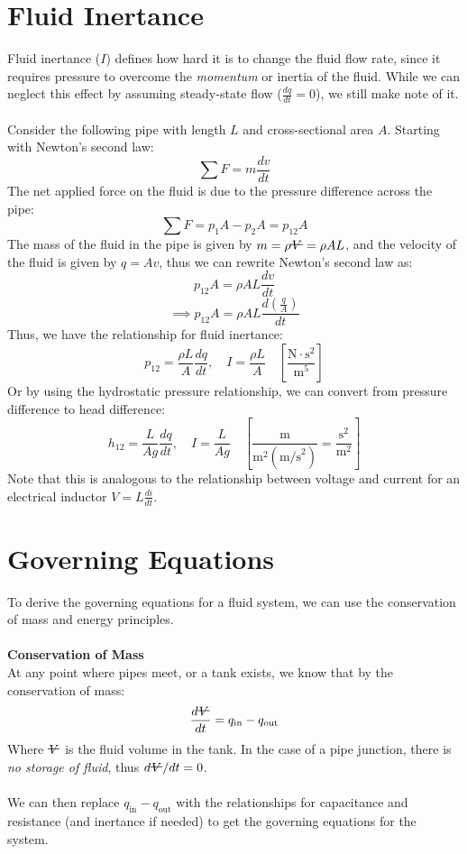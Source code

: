 \documentclass[12pt]{article}
\newcommand{\vol}{\mathord{\text{\ooalign{\hidewidth $V$\hidewidth\cr\kern-0.5pt\raisebox{0.8ex}{\rule[0pt]{1em}{0.5pt}}}}}}
\begin{document}
\section*{Fluid Inertance}
Fluid inertance ($I$) defines how hard it is to change the fluid flow rate, since it requires pressure to overcome the \textit{momentum} or inertia of the fluid. While we can neglect this effect by assuming steady-state flow ($\frac{dq}{dt}=0$), we still make note of it.\\\\
Consider the following pipe with length $L$ and cross-sectional area $A$. Starting with Newton's second law:
\[\sum F=m\frac{dv}{dt}\]
The net applied force on the fluid is due to the pressure difference across the pipe:
\[\sum F = p_1A - p_2A = p_{12}A\]
The mass of the fluid in the pipe is given by $m=\rho \vol = \rho AL$, and the velocity of the fluid is given by $q=Av$, thus we can rewrite Newton's second law as:
\[p_{12}A = \rho AL \frac{dv}{dt}\]
\[\implies p_{12}A = \rho AL \frac{d(\frac{q}{A})}{dt}\]
Thus, we have the relationship for fluid inertance:
\[\boxed{p_{12} = \frac{\rho L}{A}\frac{dq}{dt},\quad I = \frac{\rho L}{A}\quad\left[\frac{\text{N}\cdot\text{s}^2}{\text{m}^5}\right]}\]
Or by using the hydrostatic pressure relationship, we can convert from pressure difference to head difference:
\[\boxed{h_{12} = \frac{L}{Ag}\frac{dq}{dt},\quad I = \frac{L}{Ag}\quad\left[\frac{\text{m}}{\text{m}^2(\text{m/s}^2)}=\frac{\text{s}^2}{\text{m}^2}\right]}\]
Note that this is analogous to the relationship between voltage and current for an electrical inductor $V=L\frac{di}{dt}$.
\section*{Governing Equations}
To derive the governing equations for a fluid system, we can use the conservation of mass and energy principles.\\\\
\textbf{Conservation of Mass}\\
At any point where pipes meet, or a tank exists, we know that by the conservation of mass:
\[\frac{d\vol}{dt} =  q_{\text{in}} -  q_{\text{out}}\]
Where $\vol$ is the fluid volume in the tank. In the case of a pipe junction, there is \textit{no storage of fluid}, thus $d\vol/dt=0$.\\\\
We can then replace $q_{\text{in}} -  q_{\text{out}}$ with the relationships for capacitance and resistance (and inertance if needed) to get the governing equations for the system.
\end{document}
